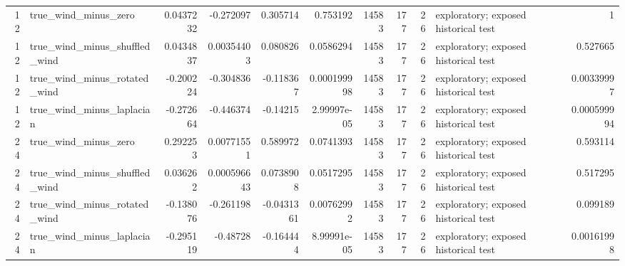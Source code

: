 \begin{tabular}{rlrrrrrrrlr}
12 & true\_wind\_minus\_zero & 0.0437232 & -0.272097 & 0.305714 & 0.753192 & 14583 & 177 & 26 & exploratory; exposed historical test & 1 \\
12 & true\_wind\_minus\_shuffled\_wind & 0.0434837 & 0.00354403 & 0.080826 & 0.0586294 & 14583 & 177 & 26 & exploratory; exposed historical test & 0.527665 \\
12 & true\_wind\_minus\_rotated\_wind & -0.200224 & -0.304836 & -0.118367 & 0.000199998 & 14583 & 177 & 26 & exploratory; exposed historical test & 0.00339997 \\
12 & true\_wind\_minus\_laplacian & -0.272664 & -0.446374 & -0.14215 & 2.99997e-05 & 14583 & 177 & 26 & exploratory; exposed historical test & 0.000599994 \\
24 & true\_wind\_minus\_zero & 0.292253 & 0.00771551 & 0.589972 & 0.0741393 & 14583 & 177 & 26 & exploratory; exposed historical test & 0.593114 \\
24 & true\_wind\_minus\_shuffled\_wind & 0.036262 & 0.000596643 & 0.0738908 & 0.0517295 & 14583 & 177 & 26 & exploratory; exposed historical test & 0.517295 \\
24 & true\_wind\_minus\_rotated\_wind & -0.138076 & -0.261198 & -0.0431361 & 0.00762992 & 14583 & 177 & 26 & exploratory; exposed historical test & 0.099189 \\
24 & true\_wind\_minus\_laplacian & -0.295119 & -0.48728 & -0.164444 & 8.99991e-05 & 14583 & 177 & 26 & exploratory; exposed historical test & 0.00161998 \\
\hline
\end{tabular}
